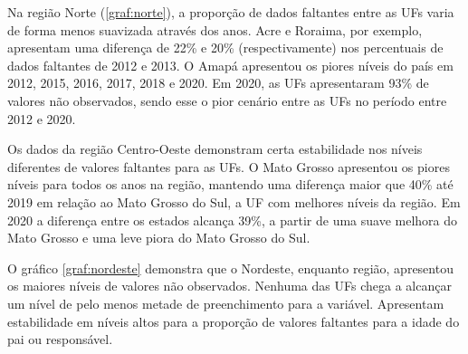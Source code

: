 Na região Norte (\ref{graf:norte}), a proporção de dados faltantes entre as UFs varia de forma menos suavizada através dos anos. Acre e Roraima, por exemplo, apresentam uma diferença de 22\% e 20\% (respectivamente) nos percentuais de dados faltantes de 2012 e 2013. O Amapá apresentou os piores níveis do país em 2012, 2015, 2016, 2017, 2018 e 2020. Em 2020, as UFs apresentaram 93\% de valores não observados, sendo esse o pior cenário entre as UFs no período entre 2012 e 2020.


Os dados da região Centro-Oeste demonstram certa estabilidade nos níveis diferentes de valores faltantes para as UFs. O Mato Grosso apresentou os piores níveis para todos os anos na região, mantendo uma diferença maior que 40\% até 2019 em relação ao Mato Grosso do Sul, a UF com melhores níveis da região. Em 2020 a diferença entre os estados alcança 39\%, a partir de uma suave melhora do Mato Grosso e uma leve piora do Mato Grosso do Sul.

O gráfico \ref{graf:nordeste} demonstra que o Nordeste, enquanto região, apresentou os maiores níveis de valores não observados. Nenhuma das UFs chega a alcançar um nível de pelo menos metade de preenchimento para a variável. Apresentam estabilidade em níveis altos para a proporção de valores faltantes para a idade do pai ou responsável. 

